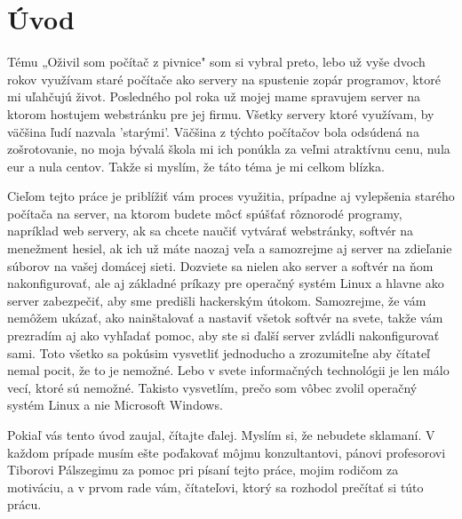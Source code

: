 \chapter*{Úvod}
\vspace{0.5cm}

{\noindent Tému „Oživil som počítač z pivnice" som si vybral preto, lebo už vyše dvoch rokov využívam staré počítače ako servery na spustenie zopár programov, ktoré mi uľahčujú život. Posledného pol roka už mojej mame spravujem server na ktorom hostujem webstránku pre jej firmu. Všetky servery ktoré využívam, by väčšina ľudí nazvala 'starými'. Väčšina z týchto počítačov bola odsúdená na zošrotovanie, no moja bývalá škola mi ich ponúkla za veľmi atraktívnu cenu, nula eur a nula centov. Takže si myslím, že táto téma je mi celkom blízka.}

Cieľom tejto práce je priblížiť vám proces využitia, prípadne aj vylepšenia starého počítača na server, na ktorom budete môcť spúšťať rôznorodé programy, napríklad web servery, ak sa chcete naučiť vytvárať webstránky, softvér na menežment hesiel, ak ich už máte naozaj veľa a samozrejme aj server na zdieľanie súborov na vašej domácej sieti. Dozviete sa nielen ako server a softvér na ňom nakonfigurovať, ale aj základné príkazy pre operačný systém Linux a hlavne ako server zabezpečiť, aby sme predišli hackerským útokom. Samozrejme, že vám nemôžem ukázať, ako nainštalovať a nastaviť všetok softvér na svete, takže vám prezradím aj ako vyhľadať pomoc, aby ste si ďalší server zvládli nakonfigurovať sami. Toto všetko sa pokúsim vysvetliť jednoducho a zrozumiteľne aby čítateľ nemal pocit, že to je nemožné. Lebo v svete informačných technológii je len málo vecí, ktoré sú nemožné. Takisto vysvetlím, prečo som vôbec zvolil operačný systém Linux a nie Microsoft Windows.

Pokiaľ vás tento úvod zaujal, čítajte ďalej. Myslím si, že nebudete sklamaní. V každom prípade musím ešte poďakovať môjmu konzultantovi, pánovi profesorovi Tiborovi Pálszegimu za pomoc pri písaní tejto práce, mojim rodičom za motiváciu, a v prvom rade vám, čítateľovi, ktorý sa rozhodol prečítať si túto prácu.

\clearpage
